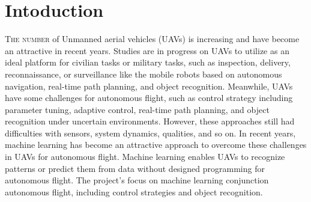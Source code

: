 \chapter{Intoduction}
\label{chap:introduction}
%
\lettrine[lines=3]{T}{he number} of Unmanned aerial vehicles (UAVs) is 
increasing and have become an attractive in recent years.\cite{Boucher:2015aa,daponte2017measurement} 
Studies are in progress on UAVs to utilize as an ideal platform for civilian
tasks or military tasks, such as inspection, delivery, reconnaissance, or
surveillance like the mobile robots based on autonomous navigation, real-time
path planning, and object recognition.\cite{Wang_2018, zhang2016deep}
Meanwhile, UAVs have some challenges for autonomous flight, such as control
strategy including parameter tuning, adaptive control, real-time path planning,
and object recognition under uncertain environments. 
However, these approaches still had difficulties with sensors, system dynamics,
qualities, and so on. 
In recent years, machine learning has become an attractive approach to overcome
these challenges in UAVs for autonomous flight. Machine learning enables UAVs to
recognize patterns or predict them from data without designed programming for
autonomous flight.\cite{advancerobotics2019}
The project's focus on machine learning conjunction autonomous flight, including
control strategies and object recognition.
%
%
